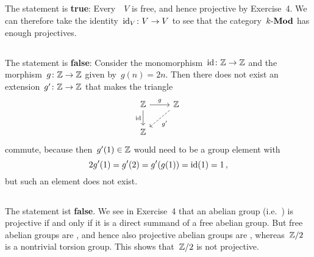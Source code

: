 \subsection{}

The statement is \textbf{true}:
Every~{\kvs}~$V$ is free, and hence projective by Exercise~4.
We can therefore take the identity~$\operatorname{id}_V \colon V \to V$ to see that the category~$\text{$k$-$\mathbf{Mod}$}$ has enough projectives.





\subsection{}

The statement is \textbf{false}:
Consider the monomorphism~$\operatorname{id} \colon \mathbb{Z} \to \mathbb{Z}$ and the morphism~$g \colon \mathbb{Z} \to \mathbb{Z}$ given by~$g(n) = 2n$.
Then there does not exist an extension~$g' \colon \mathbb{Z} \to \mathbb{Z}$ that makes the triangle
\[
  \begin{tikzcd}
      \Integer
      \arrow{r}[above]{g}
      \arrow{d}[left]{\id}
    & \Integer
      \arrow[dashed]{dl}[below right]{g'}
    \\
      \Integer
    & {}
  \end{tikzcd}
\]
commute, because then~$g'(1) \in \mathbb{Z}$ would need to be a group element with
\[
    2 g'(1)
  = g'(2)
  = g'(g(1))
  = \operatorname{id}(1)
  = 1 \,,
\]
but such an element does not exist.





\addtocounter{subsection}{1}





\subsection{}

The statement ist \textbf{false}.
We see in Exercise~4 that an abelian group (i.e.~{\module{$\Integer$}}) is projective if and only if it is a direct summand of a free abelian group.
But free abelian groups are , and hence also projective abelian groups are , whereas~$\mathbb{Z}/2$ is a nontrivial torsion group.
This shows that~$\mathbb{Z}/2$ is not projective.
